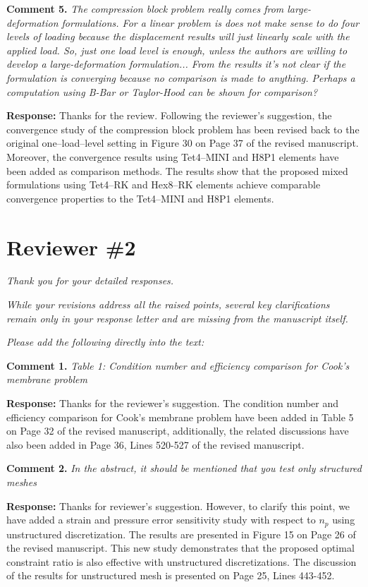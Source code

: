\documentclass{article}
\begin{document}
\textbf{Comment 5.} \textit{The compression block problem really comes from large-deformation formulations. For a linear problem is does not make sense to do four levels of loading because the displacement results will just linearly scale with the applied load. So, just one load level is enough, unless the authors are willing to develop a large-deformation formulation... From the results it's not clear if the formulation is converging because no comparison is made to anything. Perhaps a computation using B-Bar or Taylor-Hood can be shown for comparison?}

\textbf{Response:} 
Thanks for the review.
Following the reviewer's suggestion, the convergence study of the compression block problem has been revised back to the original one--load--level setting in Figure 30 on Page 37 of the revised manuscript.
Moreover, the convergence results using Tet4--MINI and H8P1 elements have been added as comparison methods.
The results show that the proposed mixed formulations using Tet4--RK and Hex8--RK elements achieve comparable convergence properties to the Tet4--MINI and H8P1 elements.

\section*{Reviewer \#2}

\textit{Thank you for your detailed responses.}

\textit{While your revisions address all the raised points, several key clarifications remain only in your response letter and are missing from the manuscript itself.}

\textit{Please add the following directly into the text:}

\textbf{Comment 1.} \textit{ Table 1: Condition number and eﬀiciency comparison for Cook's membrane problem}

\textbf{Response:}
Thanks for the reviewer's suggestion. The condition number and efficiency comparison for Cook's membrane problem have been added in Table 5 on Page 32 of the revised manuscript, 
additionally, the related discussions have also been added in Page 36, Lines 520-527 of the revised manuscript.

\textbf{Comment 2.} \textit{ In the abstract, it should be mentioned that you test only structured meshes}

\textbf{Response:} 
Thanks for reviewer's suggestion.
However, to clarify this point, we have added a strain and pressure error sensitivity study with respect to $n_p$ using unstructured discretization.
The results are presented in Figure 15 on Page 26 of the revised manuscript.
This new study demonstrates that the proposed optimal constraint ratio is also effective with unstructured discretizations.
The discussion of the results for unstructured mesh is presented on Page 25, Lines 443-452.
\end{document}
